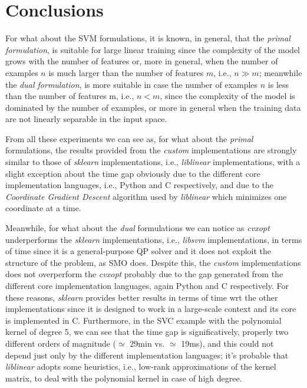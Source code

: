 \section{Conclusions}

For what about the SVM formulations, it is known, in general, that the \emph{primal formulation}, is suitable for large linear training since the complexity of the model grows with the number of features or, more in general, when the number of examples $n$ is much larger than the number of features $m$, i.e., $n \gg m$; meanwhile the \emph{dual formulation}, is more suitable in case the number of examples $n$ is less than the number of features m, i.e., $n < m$, since the complexity of the model is dominated by the number of examples, or more in general when the training data are not linearly separable in the input space.

\bigskip

From all these experiments we can see as, for what about the \emph{primal} formulations, the results provided from the \emph{custom} implementations are strongly similar to those of \emph{sklearn} implementations, i.e., \emph{liblinear} \cite{fan2008liblinear} implementations, with a slight exception about the time gap obviously due to the different core implementation languages, i.e., Python and C respectively, and due to the \emph{Coordinate Gradient Descent} algorithm used by \emph{liblinear} which minimizes one coordinate at a time.

Meanwhile, for what about the \emph{dual} formulations we can notice as \emph{cvxopt} \cite{vandenberghe2010cvxopt} underperforms the \emph{sklearn} implementations, i.e., \emph{libsvm} \cite{chang2011libsvm} implementations, in terms of time since it is a general-purpose QP solver and it does not exploit the structure of the problem, as SMO does.
Despite this, the \emph{custom} implementations does not overperform the \emph{cvxopt} probably due to the gap generated from the different core implementation languages, again Python and C respectively.
For these reasons, \emph{sklearn} provides better results in terms of time wrt the other implementations since it is designed to work in a large-scale context and its core is implemented in C.
Furthermore, in the SVC example with the polynomial kernel of degree 5, we can see that the time gap is significatively, properly two different orders of magnitude ($\simeq$ 29min vs. $\simeq$ 19ms), and this could not depend just only by the different implementation languages; it's probable that \emph{liblinear} adopts some heuristics, i.e., low-rank approximations of the kernel matrix, to deal with the polynomial kernel in case of high degree.

